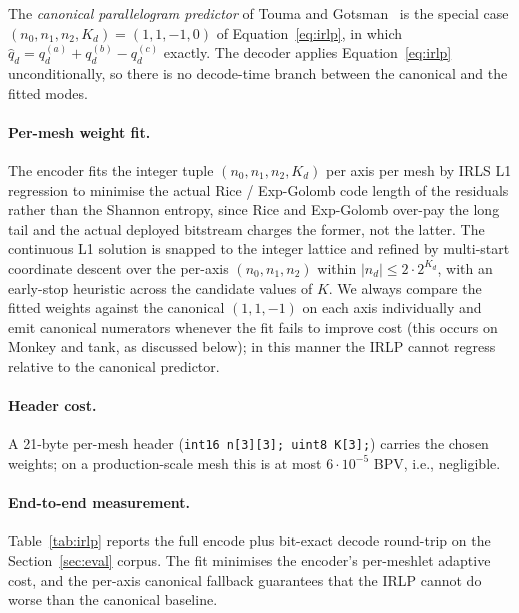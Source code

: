 \documentclass[pdflatex,sn-vancouver-num]{sn-jnl}%
\theoremstyle{thmstyleone}%
\theoremstyle{thmstyletwo}%
\theoremstyle{thmstylethree}%
\begin{document}
The \emph{canonical parallelogram predictor} of Touma and Gotsman~\cite{ref05_touma_gotsman_1998} is the special case $(n_0, n_1, n_2, K_d) = (1, 1, -1, 0)$ of Equation~\eqref{eq:irlp}, in which $\hat{q}_d = q_d^{(a)} + q_d^{(b)} - q_d^{(c)}$ exactly. The decoder applies Equation~\eqref{eq:irlp} unconditionally, so there is no decode-time branch between the canonical and the fitted modes.

\paragraph{Per-mesh weight fit.}
The encoder fits the integer tuple $(n_0, n_1, n_2, K_d)$ per axis per mesh by IRLS L1 regression to minimise the actual Rice / Exp-Golomb code length of the residuals rather than the Shannon entropy, since Rice and Exp-Golomb over-pay the long tail and the actual deployed bitstream charges the former, not the latter. The continuous L1 solution is snapped to the integer lattice and refined by multi-start coordinate descent over the per-axis $(n_0, n_1, n_2)$ within $|n_d| \le 2 \cdot 2^{K_d}$, with an early-stop heuristic across the candidate values of $K$. We always compare the fitted weights against the canonical $(1, 1, -1)$ on each axis individually and emit canonical numerators whenever the fit fails to improve cost (this occurs on Monkey and tank, as discussed below); in this manner the IRLP cannot regress relative to the canonical predictor.

\paragraph{Header cost.}
A 21-byte per-mesh header (\texttt{int16 n[3][3]; uint8 K[3];}) carries the chosen weights; on a production-scale mesh this is at most $6 \cdot 10^{-5}$ BPV, i.e., negligible.

\paragraph{End-to-end measurement.}
Table~\ref{tab:irlp} reports the full encode plus bit-exact decode round-trip on the Section~\ref{sec:eval} corpus. The fit minimises the encoder's per-meshlet adaptive cost, and the per-axis canonical fallback guarantees that the IRLP cannot do worse than the canonical baseline.
\end{document}
